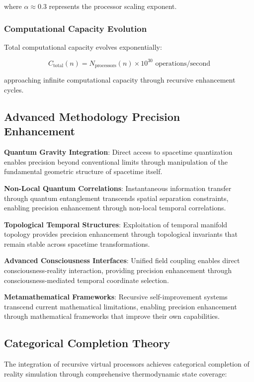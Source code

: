 \documentclass[11pt]{article}
\theoremstyle{remark}
\begin{document}
where $\alpha \approx 0.3$ represents the processor scaling exponent.

\subsubsection{Computational Capacity Evolution}

Total computational capacity evolves exponentially:

$$C_{\text{total}}(n) = N_{\text{processors}}(n) \times 10^{30} \text{ operations/second}$$

approaching infinite computational capacity through recursive enhancement cycles.

\subsection{Advanced Methodology Precision Enhancement}

\textbf{Quantum Gravity Integration}: Direct access to spacetime quantization enables precision beyond conventional limits through manipulation of the fundamental geometric structure of spacetime itself.

\textbf{Non-Local Quantum Correlations}: Instantaneous information transfer through quantum entanglement transcends spatial separation constraints, enabling precision enhancement through non-local temporal correlations.

\textbf{Topological Temporal Structures}: Exploitation of temporal manifold topology provides precision enhancement through topological invariants that remain stable across spacetime transformations.

\textbf{Advanced Consciousness Interfaces}: Unified field coupling enables direct consciousness-reality interaction, providing precision enhancement through consciousness-mediated temporal coordinate selection.

\textbf{Metamathematical Frameworks}: Recursive self-improvement systems transcend current mathematical limitations, enabling precision enhancement through mathematical frameworks that improve their own capabilities.

\subsection{Categorical Completion Theory}

The integration of recursive virtual processors achieves categorical completion of reality simulation through comprehensive thermodynamic state coverage:
\end{document}

